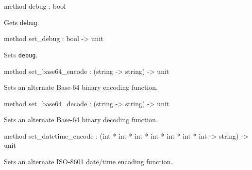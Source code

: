 \documentclass[11pt]{article}
\begin{document}
\begin{ocamldocobjectend}
\begin{ocamldocdescription}
\end{ocamldocdescription}


\label{method:XmlRpc.client.debug}\begin{ocamldoccode}
method debug : bool
\end{ocamldoccode}
\begin{ocamldocdescription}
Gets {\tt{debug}}.


\end{ocamldocdescription}


\label{method:XmlRpc.client.set-underscoredebug}\begin{ocamldoccode}
method set_debug : bool -> unit
\end{ocamldoccode}
\begin{ocamldocdescription}
Sets {\tt{debug}}.


\end{ocamldocdescription}


\label{method:XmlRpc.client.set-underscorebase64-underscoreencode}\begin{ocamldoccode}
method set_base64_encode : (string -> string) -> unit
\end{ocamldoccode}
\begin{ocamldocdescription}
Sets an alternate Base-64 binary encoding function.


\end{ocamldocdescription}


\label{method:XmlRpc.client.set-underscorebase64-underscoredecode}\begin{ocamldoccode}
method set_base64_decode : (string -> string) -> unit
\end{ocamldoccode}
\begin{ocamldocdescription}
Sets an alternate Base-64 binary decoding function.


\end{ocamldocdescription}


\label{method:XmlRpc.client.set-underscoredatetime-underscoreencode}\begin{ocamldoccode}
method set_datetime_encode :
  (int * int * int * int * int * int * int -> string) -> unit
\end{ocamldoccode}
\begin{ocamldocdescription}
Sets an alternate ISO-8601 date/time encoding function.



\end{ocamldocdescription}
\end{ocamldocobjectend}
\end{document}
